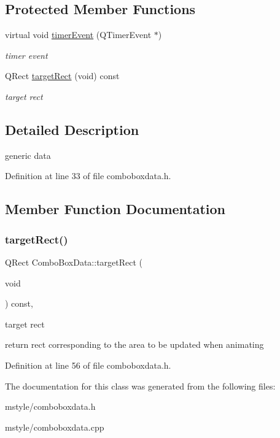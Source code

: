 \subsection*{Protected Member Functions}
\begin{DoxyCompactItemize}
\item 
\mbox{\label{class_combo_box_data_a667607bca78f378cdb7f8344b1f8dadf}} 
virtual void \hyperlink{class_combo_box_data_a667607bca78f378cdb7f8344b1f8dadf}{timer\+Event} (Q\+Timer\+Event $\ast$)
\begin{DoxyCompactList}\small\item\em timer event \end{DoxyCompactList}\item 
Q\+Rect \hyperlink{class_combo_box_data_a87fa3e39e7bdc60ee85c28827cf91c55}{target\+Rect} (void) const
\begin{DoxyCompactList}\small\item\em target rect \end{DoxyCompactList}\end{DoxyCompactItemize}


\subsection{Detailed Description}
generic data 

Definition at line 33 of file comboboxdata.\+h.



\subsection{Member Function Documentation}
\mbox{\label{class_combo_box_data_a87fa3e39e7bdc60ee85c28827cf91c55}} 
\subsubsection{\texorpdfstring{target\+Rect()}{targetRect()}}
{\footnotesize\ttfamily Q\+Rect Combo\+Box\+Data\+::target\+Rect (\begin{DoxyParamCaption}\item[{void}]{ }\end{DoxyParamCaption}) const\hspace{0.3cm}{\ttfamily [inline]}, {\ttfamily [protected]}}



target rect 

return rect corresponding to the area to be updated when animating 

Definition at line 56 of file comboboxdata.\+h.



The documentation for this class was generated from the following files\+:\begin{DoxyCompactItemize}
\item 
mstyle/comboboxdata.\+h\item 
mstyle/comboboxdata.\+cpp\end{DoxyCompactItemize}
